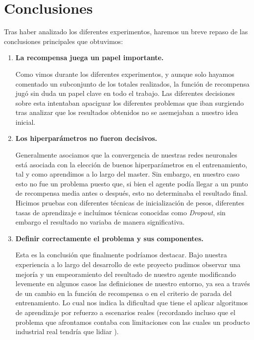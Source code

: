 
\chapter{Conclusiones}
\label{conclusiones}

Tras haber analizado los diferentes experimentos, haremos un breve repaso de las conclusiones principales que obtuvimos:

\begin{enumerate}[label=\destacado{\arabic*.}]
  \setlength\itemsep{1em}
  \item \textbf{La recompensa juega un papel importante.}
  \medskip

  Como vimos durante los diferentes experimentos, y aunque solo hayamos comentado un subconjunto de los totales realizados, la función de recompensa jugó sin duda un papel clave en todo el trabajo. Las diferentes decisiones sobre esta intentaban apaciguar los diferentes problemas que iban surgiendo tras analizar que los resultados obtenidos no se asemejaban a nuestro idea inicial.
  \medskip

  \item \textbf{Los hiperparámetros no fueron decisivos.}
  \medskip

  Generalmente asociamos que la convergencia de nuestras redes neuronales está asociada con la elección de buenos hiperparámetros en el entrenamiento, tal y como aprendimos a lo largo del master. Sin embargo, en nuestro caso esto no fue un problema puesto que, si bien el agente podía llegar a un punto de recompensa media antes o después, esto no determinaba el resultado final. Hicimos pruebas con diferentes técnicas de inicialización de pesos, diferentes tasas de aprendizaje e incluímos técnicas conocidas como \textit{Dropout}, sin embargo el resultado no variaba de manera significativa.
  \medskip

  \item \textbf{Definir correctamente el problema y sus componentes.}
  
  \medskip
  Esta es la conclusión que finalmente podríamos destacar. Bajo nuestra experiencia a lo largo del desarrollo de este proyecto pudimos observar una mejoría y un empeoramiento del resultado de nuestro agente modificando levemente en algunos casos las definiciones de nuestro entorno, ya sea a través de un cambio en la función de recompensa o en el criterio de parada del entrenamiento. Lo cual nos indica la dificultad que tiene el aplicar algoritmos de aprendizaje por refuerzo a escenarios reales (recordando incluso que el problema que afrontamos contaba con limitaciones con las cuales un producto industrial real tendría que lidiar ).
  \medskip

\end{enumerate}

